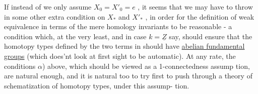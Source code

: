 If instead of  \hand{($\alpha$)}  we only assume $X_0=X'_0=e$\deleted{)} ,  it seems that we
may have to throw in some other extra condition on $X_*$  and $X'_*$  , 
in order for the definition of weak equivalence in terms of the mere
homology invariants to be reasonable  -  a condition which,  at the very
least,  and in case $k=\underline{Z}$ say,  should ensure that the homotopy types
defined by the two terms in  \hand{($\beta$)}  should have \uline{abelian fundamental groups}
(which does'nt look at first sight to be automatic).  At any rate,  the
conditions \hand{(}$\alpha$) above,  which should be viewed as a 1-connectedness assump%
tion,  are natural enough,  and it is natural too to try first to push
through a theory of schematization of homotopy types,  under this assump-%
tion.

